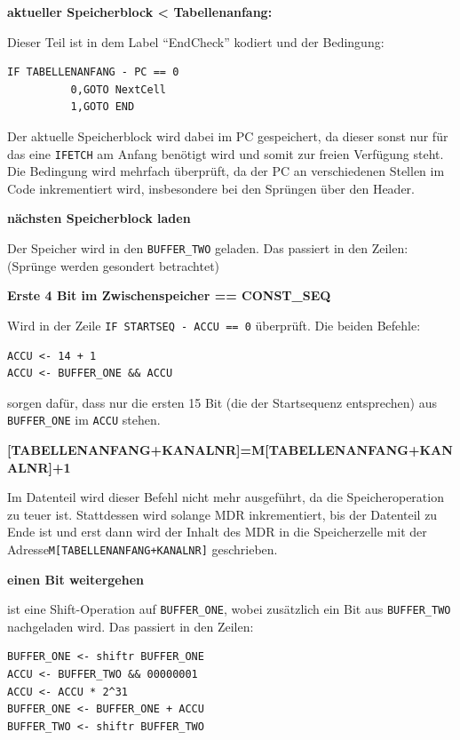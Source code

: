 \textbf{aktueller Speicherblock < Tabellenanfang:}

Dieser Teil ist in dem Label "`EndCheck"' kodiert und der Bedingung:

\begin{verbatim}
IF TABELLENANFANG - PC == 0
          0,GOTO NextCell
          1,GOTO END
\end{verbatim}

Der aktuelle Speicherblock wird dabei im PC gespeichert, da dieser sonst nur für das eine \texttt{IFETCH} am Anfang benötigt wird und somit zur freien Verfügung steht.\\
Die Bedingung wird mehrfach überprüft, da der PC an verschiedenen Stellen im Code inkrementiert wird, insbesondere bei den Sprüngen über den Header.

\textbf{nächsten Speicherblock laden}

Der Speicher wird in den \texttt{BUFFER\_TWO} geladen. Das passiert in den Zeilen: (Sprünge werden gesondert betrachtet) 

\textbf{Erste 4 Bit im Zwischenspeicher == CONST\_SEQ}

Wird in der Zeile \texttt{IF STARTSEQ - ACCU == 0} überprüft. Die beiden Befehle:

\begin{verbatim}
ACCU <- 14 + 1
ACCU <- BUFFER_ONE && ACCU
\end{verbatim}

sorgen dafür, dass nur die ersten 15 Bit (die der Startsequenz entsprechen) aus \texttt{BUFFER\_ONE} im \texttt{ACCU} stehen.

\textbf{[TABELLENANFANG+KANALNR]=M[TABELLENANFANG+KANALNR]+1}

Im Datenteil wird dieser Befehl nicht mehr ausgeführt, da die Speicheroperation zu teuer ist. Stattdessen wird solange MDR inkrementiert, bis der Datenteil zu Ende ist und erst dann wird der Inhalt des MDR in die Speicherzelle mit der Adresse\linebreak \texttt{M[TABELLENANFANG+KANALNR]} geschrieben.

\textbf{einen Bit weitergehen}

ist eine Shift-Operation auf \texttt{BUFFER\_ONE}, wobei zusätzlich ein Bit aus \texttt{BUFFER\_TWO} nachgeladen wird. Das passiert in den Zeilen:

\begin{verbatim}
BUFFER_ONE <- shiftr BUFFER_ONE
ACCU <- BUFFER_TWO && 00000001
ACCU <- ACCU * 2^31
BUFFER_ONE <- BUFFER_ONE + ACCU
BUFFER_TWO <- shiftr BUFFER_TWO
\end{verbatim}

